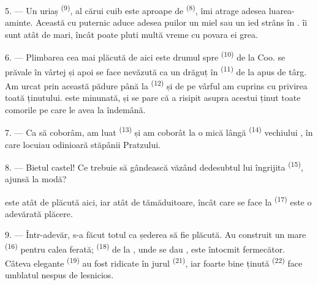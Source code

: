 5. --- Un  uriaș \textsuperscript{(9)}, al cărui cuib este aproape
de  \textsuperscript{(8)}, îmi atrage adesea luarea-aminte. Această
 cu  puternic aduce adesea puilor un miel
sau un ied strâns în .  îi sunt atât de mari, încât
poate pluti multă vreme cu povara ei grea.

\VUsaut{3.0mm}
\VUsaut{3.0mm}

6. --- Plimbarea cea mai plăcută de aici este drumul spre 
\textsuperscript{(10)} de la Coo.  se prăvale în vârtej și
apoi se face nevăzută ca un  drăguț în 
\textsuperscript{(11)} de la apus de târg. Am urcat prin această pădure până la
 \textsuperscript{(12)} și de pe vârful
 am cuprins cu privirea toată  ținutului.
 este minunată, și se pare că  a risipit asupra
acestui ținut toate comorile pe care le avea la îndemână.

7. --- Ca să coborâm, am luat  \textsuperscript{(13)} și am
coborât la o  mică lângă  \textsuperscript{(14)}
vechiului , în care locuiau odinioară stăpânii Pratzului.

8. --- Bietul castel! Ce trebuie să gândească văzând dedesubtul lui îngrijita
 \textsuperscript{(15)}, ajunsă 
la modă?

 este atât de plăcută aici, iar  atât de
tămăduitoare, încât  care se face la 
\textsuperscript{(17)} este o adevărată plăcere.

\VUsaut{3.0mm}
\VUsaut{3.0mm}

9. --- Într-adevăr, s-a făcut totul ca șederea să fie plăcută. Au construit un
 mare \textsuperscript{(16)} pentru calea ferată;
 \textsuperscript{(18)} de la , unde se dau
, este întocmit fermecător. Câteva  elegante
\textsuperscript{(19)} au fost ridicate în jurul 
\textsuperscript{(21)}, iar  foarte bine ținută
\textsuperscript{(22)} face umblatul nespus de lesnicios.

